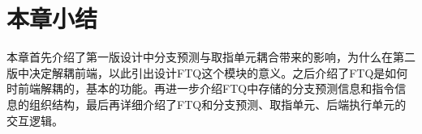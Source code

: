 







\section{本章小结}

本章首先介绍了第一版设计中分支预测与取指单元耦合带来的影响，为什么在第二版中决定解耦前端，以此引出设计FTQ这个模块的意义。之后介绍了FTQ是如何时前端解耦的，基本的功能。再进一步介绍FTQ中存储的分支预测信息和指令信息的组织结构，最后再详细介绍了FTQ和分支预测、取指单元、后端执行单元的交互逻辑。

